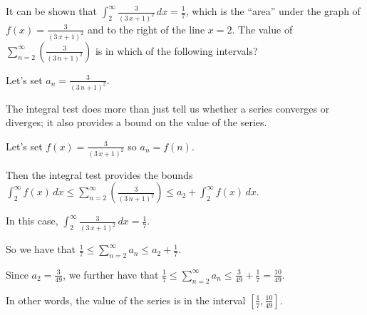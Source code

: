 \documentclass{ximera}
\begin{document}
\begin{question}
  It can be shown that \(\displaystyle\int_{2}^\infty \displaystyle\frac{3}{ {\left(3 \, x + 1\right)}^{2} } \, dx = \displaystyle\frac{1}{7}\), which is the ``area'' under the graph of \(\displaystyle f(x) = \displaystyle\frac{3}{ {\left(3 \, x + 1\right)}^{2} }\) and to the right of the line \(x = 2\).  The value of \(\displaystyle\sum_{n=2}^\infty \left( \displaystyle\frac{3}{ {\left(3 \, n + 1\right)}^{2} } \right)\) is in which of the following intervals?

  \begin{solution}
    \begin{hint}
      Let's set \(a_n = \displaystyle\frac{3}{ {\left(3 \, n + 1\right)}^{2} }\).
    \end{hint}
    \begin{hint}
      The integral test does more than just tell us whether a series converges or diverges; it also provides a bound on the value of the series.
    \end{hint}
    \begin{hint}
      Let's set \(f(x) = \displaystyle\frac{3}{ {\left(3 \, x + 1\right)}^{2} }\) so \(a_n = f(n)\).
    \end{hint}
    \begin{hint}
      Then the integral test provides the bounds \(\displaystyle\int_{2}^\infty f(x) \, dx \leq \displaystyle\sum_{n=2}^\infty \left( \displaystyle\frac{3}{ {\left(3 \, n + 1\right)}^{2} } \right) \leq a_{2} + \displaystyle\int_{2}^\infty f(x) \, dx\).
    \end{hint}
    \begin{hint}
      In this case, \(\displaystyle\int_{2}^\infty \displaystyle\frac{3}{ {\left(3 \, x + 1\right)}^{2} } \, dx = \displaystyle\frac{1}{7}\).
    \end{hint}
    \begin{hint}
      So we have that \(\displaystyle\frac{1}{7} \leq \displaystyle\sum_{n=2}^\infty a_{n} \leq a_{2} + \displaystyle\frac{1}{7}\).
    \end{hint}
    \begin{hint}
      Since \(a_{2} = \displaystyle\frac{3}{49}\), we further have that \(\displaystyle\frac{1}{7} \leq \displaystyle\sum_{n=2}^\infty a_{n} \leq \displaystyle\frac{3}{49} + \displaystyle\frac{1}{7} = \displaystyle\frac{10}{49}\).
    \end{hint}
    \begin{hint}
      In other words, the value of the series is in the interval \(\left[\displaystyle\frac{1}{7}, \displaystyle\frac{10}{49}\right]\).
    \end{hint}
    
    \begin{multiple-choice}
      \choice[correct]{[1/7, 10/49]}
      \choice{[4/49, 1/7]}
      \choice{[3/49, 1/7]}
      \choice{[10/49, 13/49]}
      
    \end{multiple-choice}
    
  \end{solution}
\end{question}
\end{document}
